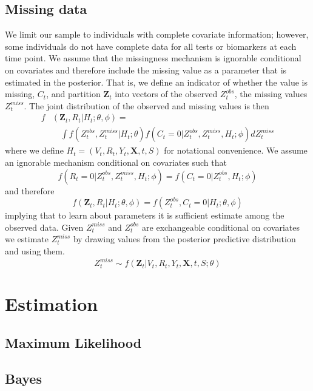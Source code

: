 \documentclass[12pt]{article}
\begin{document}
\subsection{Missing data} 
We limit our sample to individuals with complete covariate information; however, some individuals do not have complete data for all tests or biomarkers at each time point. We assume that the missingness mechanism is ignorable conditional on covariates and therefore include the missing value as a parameter that is estimated in the posterior. That is, we define an indicator of whether the value is missing, $C_t$, and partition $\mathbf{Z}_t$ into vectors of the observed $Z^{obs}_t$, the missing values $Z^{miss}_t$. The joint distribution of the observed and missing values is then
\begin{align*}
    f&(\mathbf{Z}_t, R_t | H_t; \theta, \phi) = \\
    & \quad \int f(Z^{obs}_t, Z^{miss}_t | H_t; \theta) f(C_t = 0 | Z^{obs}_t, Z^{miss}_t, H_t; \phi) dZ^{miss}_t
\end{align*}
where we define $H_t = (V_t, R_t, Y_t, \mathbf{X}, t, S)$ for notational convenience. We assume an ignorable mechanism conditional on covariates such that
\begin{equation*}
    f(R_t = 0 | Z^{obs}_t, Z^{miss}_t, H_t; \phi) = f(C_t = 0 | Z^{obs}_t, H_t; \phi)
\end{equation*}
and therefore 
\begin{equation*}
    f(\mathbf{Z}_t, R_t | H_t; \theta, \phi) = f(Z^{obs}_t, C_t = 0 | H_t; \theta, \phi) 
\end{equation*}
implying that to learn about parameters it is sufficient estimate among the observed data. Given $Z^{miss}_t$ and $Z^{obs}_t$ are exchangeable conditional on covariates we estimate $Z^{miss}_t$ by drawing values from the posterior predictive distribution and using them. 
\begin{equation*}
    Z^{miss}_t \sim f(\mathbf{Z}_t | V_t, R_t, Y_t, \mathbf{X}, t, S; \theta)
\end{equation*}

\section{Estimation}
\subsection{Maximum Likelihood}
\subsection{Bayes}
\end{document}
